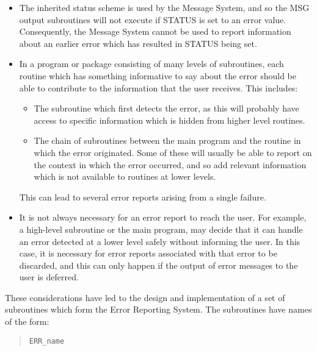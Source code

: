 \documentclass[twoside,11pt]{article}
\renewcommand{\_}{\texttt{\symbol{95}}}
\begin{document}
\begin {itemize}
\item The inherited status scheme is used by the Message System, and so the
MSG output subroutines will not execute if STATUS is set to an error value.
Consequently, the Message System cannot be used to report information about
an earlier error which has resulted in STATUS being set.

\item In a program or package consisting of many levels of subroutines, each
routine which has something informative to say about the error should be
able to contribute to the information that the user receives.
This includes:

\begin {itemize}
\item The subroutine which first detects the error, as this will probably
have access to specific information which is hidden from higher level
routines.

\item The chain of subroutines between the main program and the routine in
which the error originated.
Some of these will usually be able to report on the context in which the error
occurred, and so add relevant information which is not available to routines
at lower levels.
\end {itemize}

This can lead to several error reports arising from a single failure.

\item It is not always necessary for an error report to reach the user.
For example, a high-level subroutine or the main program, may decide that it
can handle an error detected at a lower level safely without informing the
user.
In this case, it is necessary for error reports associated with that
error to be discarded, and this can only happen if the output of error
messages to the user is deferred.

\end {itemize}

These considerations have led to the design and implementation of a set of
subroutines which form the Error Reporting System.
The subroutines have names of the form:

\begin {quote}
\begin {small}
\begin{verbatim}
ERR_name
\end{verbatim}
\end {small}
\end {quote}
\end{document}
